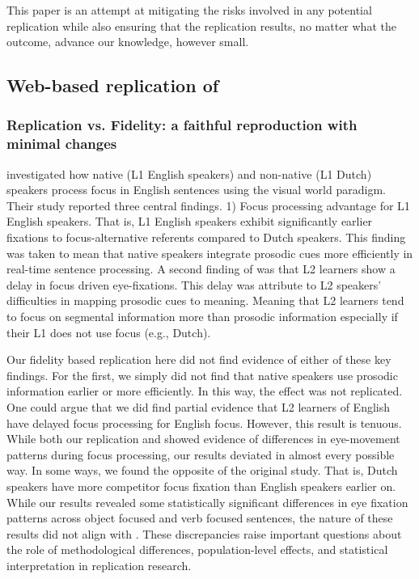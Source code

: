 This paper is an attempt at mitigating the risks involved in any potential replication while also ensuring that the replication results, no matter what the outcome, advance our knowledge, however small. 

\subsection{Web-based replication of \cite{Ge2021}}

\subsubsection{Replication vs. Fidelity: a faithful reproduction with minimal changes}

\cite{Ge2021} investigated how native (L1 English speakers) and non-native (L1 Dutch) speakers process focus in English sentences using the visual world paradigm. Their study reported three central findings. 1) Focus processing advantage for L1 English speakers. That is, L1 English speakers exhibit significantly earlier fixations to focus-alternative referents compared to Dutch speakers. This finding was taken to mean that native speakers integrate prosodic cues more efficiently in real-time sentence processing. A second finding of \cite{Ge2021} was that L2 learners show a delay in focus driven eye-fixations. This delay was attribute to L2 speakers' difficulties in mapping prosodic cues to meaning. Meaning that L2 learners tend to focus on segmental information more than prosodic information especially if their L1 does not use focus (e.g., Dutch). 

Our fidelity based replication here did not find evidence  of either of these key findings. For the first, we simply did not find that native speakers use prosodic information earlier or more efficiently. In this way, the effect was not replicated. One could argue that we did find partial evidence that L2 learners of English have delayed focus processing for English focus. However, this result is tenuous. While both our replication and \cite{Ge2021} showed evidence of differences in eye-movement patterns during focus processing, our results deviated in almost every possible way. In some ways, we found the opposite of the original study. That is, Dutch speakers have more competitor focus fixation than English speakers earlier on. While our results revealed some statistically significant differences in eye fixation patterns across object focused and verb focused sentences, the nature of these results did not align with \cite{Ge2021}. These discrepancies raise important questions about the role of methodological differences, population-level effects, and statistical interpretation in replication research. 

